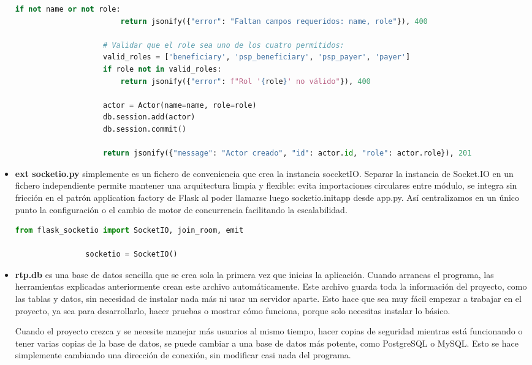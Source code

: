 \begin{itemize}
\begin{lstlisting}[language=Python, style=custom, caption={Declaración blueprint actores}]
                    if not name or not role:
                        return jsonify({"error": "Faltan campos requeridos: name, role"}), 400

                    # Validar que el role sea uno de los cuatro permitidos:
                    valid_roles = ['beneficiary', 'psp_beneficiary', 'psp_payer', 'payer']
                    if role not in valid_roles:
                        return jsonify({"error": f"Rol '{role}' no válido"}), 400

                    actor = Actor(name=name, role=role)
                    db.session.add(actor)
                    db.session.commit()

                    return jsonify({"message": "Actor creado", "id": actor.id, "role": actor.role}), 201

            \end{lstlisting}

    \item \textbf{ext socketio.py} simplemente es un fichero de conveniencia que crea la instancia soccketIO.
            Separar la instancia de Socket.IO en un fichero independiente permite mantener una arquitectura limpia y flexible: evita importaciones circulares entre módulo, se integra sin fricción en el patrón application factory de Flask al poder llamarse luego socketio.initapp desde app.py. Así centralizamos en un único punto la configuración o el cambio de motor de concurrencia facilitando la escalabilidad.
            \begin{lstlisting}[language=Python, style=custom, caption={Instancia global de socketIO}]
                from flask_socketio import SocketIO, join_room, emit

                socketio = SocketIO()
            \end{lstlisting}


    \item \textbf{rtp.db} es una base de datos sencilla que se crea sola la primera vez que inicias la aplicación. Cuando arrancas el programa, las herramientas explicadas anteriormente crean este archivo automáticamente. Este archivo guarda toda la información del proyecto, como las tablas y datos, sin necesidad de instalar nada más ni usar un servidor aparte. Esto hace que sea muy fácil empezar a trabajar en el proyecto, ya sea para desarrollarlo, hacer pruebas o mostrar cómo funciona, porque solo necesitas instalar lo básico.

        Cuando el proyecto crezca y se necesite manejar más usuarios al mismo tiempo, hacer copias de seguridad mientras está funcionando o tener varias copias de la base de datos, se puede cambiar a una base de datos más potente, como PostgreSQL o MySQL. Esto se hace simplemente cambiando una dirección de conexión, sin modificar casi nada del programa.
\end{itemize}

